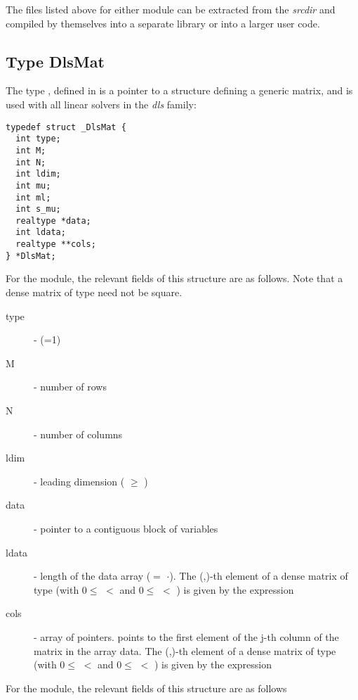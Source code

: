 The files listed above for either module can be extracted  from the {\sundials} 
{\em srcdir} and compiled by themselves into a separate library or into a larger user code.

\subsection{Type DlsMat}
The type , defined in  is a pointer to a 
structure defining a generic matrix, and is used with all linear solvers in 
the {\em dls} family:
\begin{verbatim}
typedef struct _DlsMat {
  int type;
  int M;
  int N;
  int ldim;
  int mu;
  int ml;
  int s_mu;
  realtype *data;
  int ldata;
  realtype **cols;
} *DlsMat;
\end{verbatim}
For the {\dense} module, the relevant fields of this structure are as follows.
Note that a dense matrix of type  need not be square.
\begin{description}
  \item[type]  -  (=1)
  \item[M]  - number of rows
  \item[N]  - number of columns
  \item[ldim]  - leading dimension ( $\ge$ )
  \item[data]  - pointer to a contiguous block of  variables
  \item[ldata] - length of the data array ($=$ $\cdot$).
    The (,)-th element of a dense matrix  of type 
    (with $0 \le$  $<$  and $ 0 \le$  $<$ ) 
    is given by the expression 
  \item[cols]  - array of pointers.  points to the first element 
    of the j-th column of the matrix in the array data.
    The (,)-th element of a dense matrix  of type 
    (with $0 \le$  $<$  and $ 0 \le$  $<$ ) 
    is given by the expression  
\end{description}
For the {\band} module, the relevant fields of this structure are as follows

